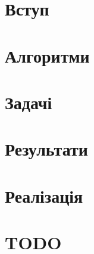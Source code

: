 \documentclass[a4paper,14pt,openany,twoside,oldfontcommands]{memoir}
\begin{document}

\newpage

\setcounter{page}{2}


\newpage

\setcounter{tocdepth}{3}
\tableofcontents*
\newpage

\chapter{Вступ}


\chapter{Алгоритми}


\chapter{Задачі}


\chapter{Результати}


\chapter{Реалізація}


\chapter{TODO}

\end{document}
